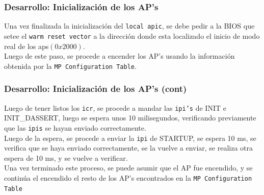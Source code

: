 \documentclass{beamer}
\begin{document}

\begin{frame}
  \frametitle{Desarrollo: \small Inicialización de los AP's}
  Una vez finalizada la inicialización del \texttt{local apic}, se debe pedir a la BIOS que setee el \texttt{warm reset vector} a la dirección donde esta localizado el inicio de modo real de los aps$(0x2000)$.\\
  \vspace{10pt}
  Luego de este paso, se procede a encender los AP's usando la información obtenida por la \texttt{MP Configuration Table}.
\end{frame}

\begin{frame}
  \frametitle{Desarrollo: \small Inicialización de los AP's (cont)}
  Luego de tener listos los \texttt{icr}, se procede a mandar las \texttt{ipi's} de INIT e INIT\_DASSERT, luego se espera unos 10 milisegundos, verificando previamente que las \texttt{ipis} se hayan enviado correctamente. \\
  \vspace{10pt}
  Luego de la espera, se procede a enviar la \texttt{ipi} de STARTUP, se espera 10 ms, se verifica que se haya enviado correctamente, se la vuelve a enviar, se realiza otra espera de 10 ms, y se vuelve a verificar.\\
  \vspace{10pt}
  Una vez terminado este proceso, se puede asumir que el AP fue encendido, y se continúa el encendido el resto de los AP's encontrados en la \texttt{MP Configuration Table}
\end{frame}
\end{document}

